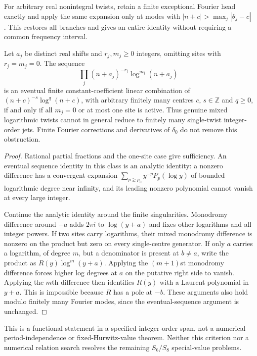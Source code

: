 For arbitrary real nonintegral twists, retain a finite exceptional
Fourier head exactly and apply the same expansion only at modes with
$|n+c|>\max_j|\theta_j-c|$. This restores all branches and gives an
entire identity without requiring a common frequency interval.

\begin{theorem}
\label{utj:thm:nonclosure}
Let $a_j$ be distinct real shifts and $r_j,m_j\ge0$ integers, omitting
sites with $r_j=m_j=0$. The sequence
\[
 \prod_j(n+a_j)^{-r_j}\log^{m_j}(n+a_j)
\]
is an eventual finite constant-coefficient linear combination of
$(n+c)^{-s}\log^q(n+c)$, with arbitrary finitely many centres $c$,
$s\in\mathbb Z$ and $q\ge0$, if and only if all $m_j=0$ or at most
one site is active. Thus genuine mixed logarithmic twists cannot
in general reduce to finitely many single-twist integer-order jets.
Finite Fourier corrections and derivatives of $\delta_0$ do not
remove this obstruction.
\end{theorem}
\begin{proof}
Rational partial fractions and the one-site case give sufficiency.
An eventual sequence identity in this class is an analytic identity:
a nonzero difference has a convergent expansion
$\sum_{p\ge p_0}y^{-p}P_p(\log y)$ of bounded logarithmic degree near
infinity, and its leading nonzero polynomial cannot vanish at every
large integer.

Continue the analytic identity around the finite singularities.
Monodromy difference around $-a$ adds $2\pi i$ to $\log(y+a)$
and fixes other logarithms and all integer powers. If two sites carry
logarithms, their mixed monodromy difference is nonzero on the product
but zero on every single-centre generator. If only $a$ carries a
logarithm, of degree $m$, but a denominator is present at $b\ne a$,
write the product as $R(y)\log^m(y+a)$. Applying the $(m+1)$st
monodromy difference forces higher log degrees at $a$ on the putative
right side to vanish. Applying the $m$th difference then identifies
$R(y)$ with a Laurent polynomial in $y+a$. This is impossible because
$R$ has a pole at $-b$. These arguments also hold modulo finitely many
Fourier modes, since the eventual-sequence argument is unchanged.
\end{proof}

This is a functional statement in a specified integer-order span,
not a numerical period-independence or fixed-Hurwitz-value theorem.
Neither this criterion nor a numerical relation search resolves the
remaining $S_6/S_8$ special-value problems.

